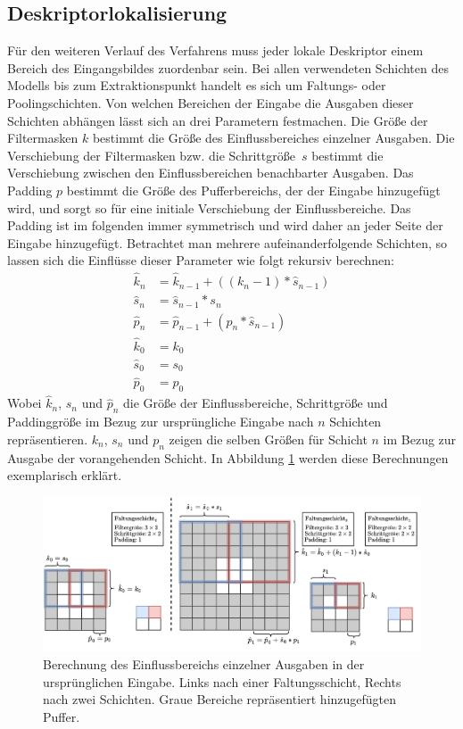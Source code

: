 \subsection{Deskriptorlokalisierung}\label{rf_chapter}
Für den weiteren Verlauf des Verfahrens muss jeder lokale Deskriptor einem Bereich des Eingangsbildes zuordenbar sein. Bei allen verwendeten Schichten des Modells bis zum Extraktionspunkt handelt es sich um Faltungs- oder Poolingschichten. Von welchen Bereichen der Eingabe die Ausgaben dieser Schichten abhängen lässt sich an drei Parametern festmachen. Die Größe der Filtermasken $k$ bestimmt die Größe des Einflussbereiches einzelner Ausgaben. Die Verschiebung der Filtermasken bzw. die Schrittgröße~$s$ bestimmt die Verschiebung zwischen den Einflussbereichen benachbarter Ausgaben. Das Padding $p$ bestimmt die Größe des Pufferbereichs, der der Eingabe hinzugefügt wird, und sorgt so für eine initiale Verschiebung der Einflussbereiche. Das Padding ist im folgenden immer symmetrisch und wird daher an jeder Seite der Eingabe hinzugefügt. Betrachtet man mehrere aufeinanderfolgende Schichten, so lassen sich die Einflüsse dieser Parameter wie folgt rekursiv berechnen:
\begin{align}
\hat{k}_n &= \hat{k}_{n-1} + ((k_n - 1) * \hat{s}_{n-1})
\\
\hat{s}_n &= \hat{s}_{n-1} * s_n
\\
\hat{p}_n &= \hat{p}_{n-1} + (p_n * \hat{s}_{n-1})
\\
\hat{k}_0 &= k_0
\\
\hat{s}_0 &= s_0
\\
\hat{p}_0 &= p_0
\end{align}
Wobei $\hat{k}_n$, $\hat{s}_n$ und $\hat{p}_n$ die Größe der Einflussbereiche, Schrittgröße und Paddinggröße im Bezug zur ursprüngliche Eingabe nach $n$ Schichten repräsentieren. $k_n$, $s_n$ und $p_n$ zeigen die selben Größen für Schicht $n$ im Bezug zur Ausgabe der vorangehenden Schicht. In Abbildung \ref{receptive_field} werden diese Berechnungen exemplarisch erklärt.
\begin{figure}[h]
\centering
\includegraphics[scale=0.51]{rf.pdf}
\caption{Berechnung des Einflussbereichs einzelner Ausgaben in der ursprünglichen Eingabe. Links nach einer Faltungsschicht, Rechts nach zwei Schichten. Graue Bereiche repräsentiert hinzugefügten Puffer.}
\label{receptive_field}
\end{figure}
